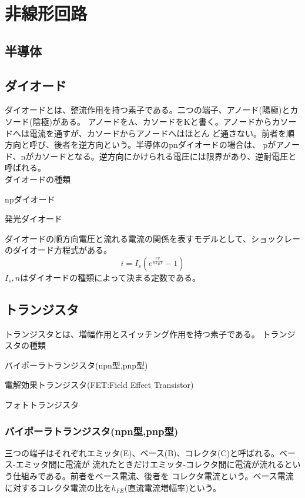     \section{非線形回路}
        \subsection{半導体}
        \subsection{ダイオード}
            ダイオードとは、整流作用を持つ素子である。二つの端子、アノード(陽極)とカソード(陰極)がある。
            アノードをA、カソードをKと書く。アノードからカソードへは電流を通すが、カソードからアノードへはほとん
            ど通さない。前者を順方向と呼び、後者を逆方向という。半導体のpnダイオードの場合は、
            pがアノード、nがカソードとなる。逆方向にかけられる電圧には限界があり、逆耐電圧と呼ばれる。\\
            ダイオードの種類
            \begin{enumrate}
                \item npダイオード
                \item 発光ダイオード
            \end{enumrate}
            ダイオードの順方向電圧と流れる電流の関係を表すモデルとして、ショックレーのダイオード方程式がある。
                \[i = I_s(e^{\frac{ev}{nk_BT}}-1)\]
            $I_s,n$はダイオードの種類によって決まる定数である。
        \subsection{トランジスタ}
            トランジスタとは、増幅作用とスイッチング作用を持つ素子である。
            トランジスタの種類
            \begin{enumrate}
                \item バイポーラトランジスタ(npn型,pnp型)
                \item 電解効果トランジスタ(FET:Field Effect Transistor)
                \item フォトトランジスタ
            \end{enumrate}
            \subsubsection{バイポーラトランジスタ(npn型,pnp型)}
                三つの端子はそれぞれエミッタ(E)、ベース(B)、コレクタ(C)と呼ばれる。ベース-エミッタ間に電流が
                流れたときだけエミッタ-コレクタ間に電流が流れるという仕組みである。前者をベース電流、後者を
                コレクタ電流という。ベース電流に対するコレクタ電流の比を$h_{FE}$(直流電流増幅率)という。
